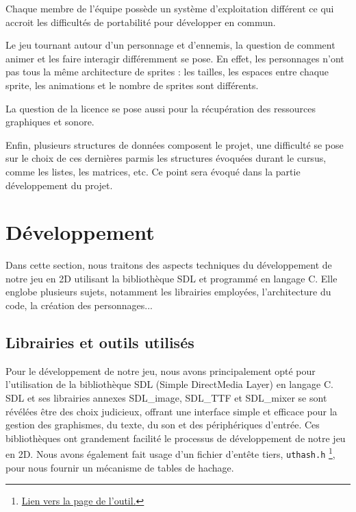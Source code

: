 \documentclass[a4paper,12pt]{article}
\begin{document}
Chaque membre de l’équipe possède un système d’exploitation différent ce qui accroit les difficultés de portabilité pour développer en commun.

Le jeu tournant autour d’un personnage et d’ennemis, la question de comment animer et les faire interagir différemment se pose. 
En effet, les personnages n’ont pas tous la même architecture de sprites :  les tailles,  les espaces entre chaque sprite, les animations et le nombre de sprites sont différents.

La question de la licence se pose aussi pour la récupération des ressources graphiques et sonore.

Enfin, plusieurs structures de données composent le projet, une difficulté se pose sur le choix de ces dernières parmis les structures évoquées durant le cursus, comme les listes, les matrices, etc.
Ce point sera évoqué dans la partie développement du projet.


\section{Développement}

Dans cette section, nous traitons des aspects techniques du développement de notre jeu en 2D utilisant la bibliothèque SDL et programmé en langage C. Elle englobe plusieurs sujets, notamment les librairies employées, l'architecture du code, la création des personnages...

\subsection{Librairies et outils utilisés}

Pour le développement de notre jeu, nous avons principalement opté pour l'utilisation de la bibliothèque SDL (Simple DirectMedia Layer) en langage C.
SDL et ses librairies annexes SDL\_image, SDL\_TTF et SDL\_mixer se sont révélées être des choix judicieux, offrant une interface simple et efficace pour la gestion des graphismes, du texte, du son et des périphériques d'entrée.
Ces bibliothèques ont grandement facilité le processus de développement de notre jeu en 2D.
Nous avons également fait usage d’un fichier d’entête tiers, \texttt{uthash.h} \footnote{\href{https://troydhanson.github.io/uthash/userguide.html}{Lien vers la page de l’outil.}}, pour nous fournir un mécanisme de tables de hachage.
\end{document}
